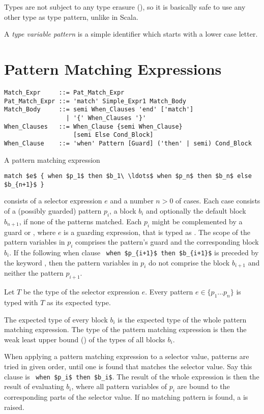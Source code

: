Types are not subject to any type erasure (), so it is basically safe to use any other type as type pattern, unlike in Scala. 

A {\em type variable pattern} is a simple identifier which starts with a lower case letter. 






\section{Pattern Matching Expressions}

\syntax\begin{lstlisting}
Match_Expr     ::= Pat_Match_Expr
Pat_Match_Expr ::= 'match' Simple_Expr1 Match_Body
Match_Body     ::= semi When_Clauses 'end' ['match']
                 | '{' When_Clauses '}'
When_Clauses   ::= When_Clause {semi When_Clause} 
                   [semi Else Cond_Block]
When_Clause    ::= 'when' Pattern [Guard] ('then' | semi) Cond_Block
\end{lstlisting}

A pattern matching expression 
\begin{lstlisting}
match $e$ { when $p_1$ then $b_1\ \ldots$ when $p_n$ then $b_n$ else $b_{n+1}$ }
\end{lstlisting}
consists of a selector expression $e$ and a number $n > 0$ of cases. Each case consists of a (possibly guarded) pattern $p_i$, a block $b_i$ and optionally the default block $b_{n+1}$, if none of the patterns matched. Each $p_i$ might be complemented by a guard  or , where $e$ is a guarding expression, that is typed as . The scope of the pattern variables in $p_i$ comprises the pattern's guard and the corresponding block $b_i$. If the following when clause ~\lstinline!when $p_{i+1}$ then $b_{i+1}$! is preceded by the keyword , then the pattern variables in $p_i$ do not comprise the block $b_{i+1}$ and neither the pattern $p_{i+1}$. 

Let $T$ be the type of the selector expression $e$. Every pattern $e \in \{ p_1 \ldots p_n \}$ is typed with $T$ as its expected type. 

The expected type of every block $b_i$ is the expected type of the whole pattern matching expression. The type of the pattern matching expression is then the weak least upper bound () of the types of all blocks $b_i$. 

When applying a pattern matching expression to a selector value, patterns are tried in given order, until one is found that matches the selector value. Say this  clause is ~\lstinline!when $p_i$ then $b_i$!. The result of the whole expression is then the result of evaluating $b_i$, where all pattern variables of $p_i$ are bound to the corresponding parts of the selector value. If no matching pattern is found, a  is raised. 

